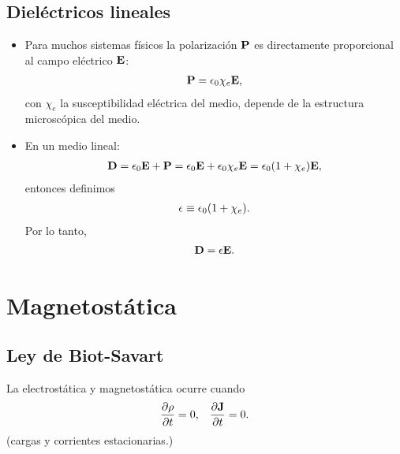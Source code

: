 \subsection{Dieléctricos lineales}
\begin{itemize}
\item Para muchos sistemas físicos la polarización $\vb{P}$ es directamente 
proporcional al campo eléctrico $\vb{E}$:
\begin{align}
\vb{P}=\epsilon_0 \chi_e\vb{E},
\end{align}
con $\chi_e$ la susceptibilidad eléctrica del medio, depende 
de la estructura microscópica del medio.

\item En un medio lineal:
\begin{align}
\vb{D}=\epsilon_0\vb{E}+\vb{P}=\epsilon_0\vb{E}+\epsilon_0\chi_e\vb{E}=
\epsilon_0\qty(1+\chi_e)\vb{E},
\end{align}
entonces definimos
\begin{align}
\epsilon \equiv  \epsilon_0\qty(1+\chi_e).
\end{align}
Por lo tanto,
\begin{align*}
\vb{D}=\epsilon\vb{E}.
\end{align*}
\end{itemize}

\section{Magnetostática}
\subsection{Ley de Biot-Savart}
La electrostática y magnetostática ocurre cuando
\begin{align*}
\pdv{\rho}{t}=0, \hspace{3mm} \pdv{\vb{J}}{t}=0.
\end{align*}
(cargas y corrientes estacionarias.)

